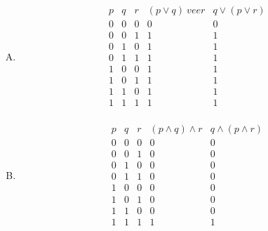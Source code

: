 {    %
    \begin{practices}
        \begin{enumerate}[A.]
            \item
            {
                \begin{table}[H]
                    \[
                        \begin{array}{c|c|c|c|c}
                            \hline
                            p & q & r & (p \vee q) \ vee r & q \vee (p \vee r) \\
                            \hline
                            0 & 0 & 0 & 0 & 0 \\
                            0 & 0 & 1 & 1 & 1 \\
                            0 & 1 & 0 & 1 & 1 \\
                            0 & 1 & 1 & 1 & 1 \\
                            1 & 0 & 0 & 1 & 1 \\
                            1 & 0 & 1 & 1 & 1 \\
                            1 & 1 & 0 & 1 & 1 \\
                            1 & 1 & 1 & 1 & 1 \\
                        \end{array}
                    \]
                \end{table}
            }
            \item
            {
                \begin{table}[H]
                    \[
                        \begin{array}{c|c|c|c|c}
                            \hline
                            p & q & r & (p \wedge q) \wedge r & q \wedge (p \wedge r) \\
                            \hline
                            0 & 0 & 0 & 0 & 0 \\
                            0 & 0 & 1 & 0 & 0 \\
                            0 & 1 & 0 & 0 & 0 \\
                            0 & 1 & 1 & 0 & 0 \\
                            1 & 0 & 0 & 0 & 0 \\
                            1 & 0 & 1 & 0 & 0 \\
                            1 & 1 & 0 & 0 & 0 \\
                            1 & 1 & 1 & 1 & 1 \\
                        \end{array}
                    \]
                \end{table}
            }
        \end{enumerate}
    \end{practices}

}
